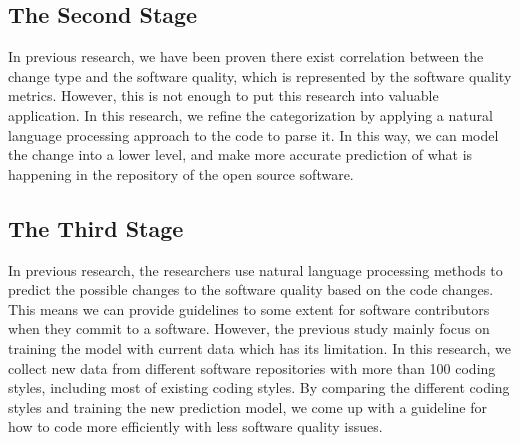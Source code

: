 \subsection{The Second Stage}
In previous research, we have been proven there exist correlation between the change type and the software quality, which is represented by the software quality metrics. However, this is not enough to put this research into valuable application. In this research, we refine the categorization by applying a natural language processing approach to the code to parse it. In this way, we can model the change into a lower level, and make more accurate prediction of what is happening in the repository of the open source software. 


\subsection{The Third Stage}
In previous research, the researchers use natural language processing methods to predict the possible changes to the software quality based on the code changes. This means we can provide guidelines to some extent for software contributors when they commit to a software. However, the previous study mainly focus on training the model with current data which has its limitation. In this research, we collect new data from different software repositories with more than 100 coding styles, including most of existing coding styles. By comparing the different coding styles and training the new prediction model, we come up with a guideline for how to code more efficiently with less software quality issues.


